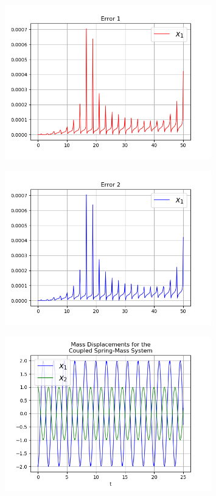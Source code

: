 \documentclass{article}
\begin{document}
\begin{figure}[!ht]
\centering
\includegraphics[width=0.8\textwidth]{two_springs1-E1.png}
\end{figure}
\begin{figure}[!ht]
\centering
\includegraphics[width=0.8\textwidth]{two_springs1-E2.png}
\end{figure}
\begin{figure}[!ht]
\centering
\includegraphics[width=0.8\textwidth]{two_springs2-1.png}
\end{figure}
\end{document}
